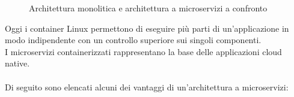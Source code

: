 \begin{figure}[ht]
	\centering
	\caption{Architettura monolitica e architettura a microservizi a confronto}
	\label{fig:one}
\end{figure}

Oggi i container Linux permettono di eseguire più parti di un'applicazione in modo indipendente con un controllo superiore sui singoli componenti.\\
I microservizi containerizzati rappresentano la base delle applicazioni cloud native. \cite{RedHatDocker}\\ \\
Di seguito sono elencati alcuni dei vantaggi di un'architettura a microservizi:


